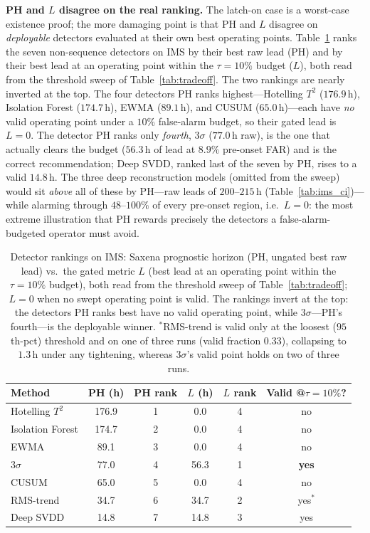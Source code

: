 \documentclass[journal]{IEEEtran}
\begin{document}
\textbf{PH and $L$ disagree on the real ranking.} The latch-on case is a worst-case
existence proof; the more damaging point is that PH and $L$ disagree on
\emph{deployable} detectors evaluated at their own best operating points.
Table~\ref{tab:phrank} ranks the seven non-sequence detectors on IMS by their best
raw lead (PH) and by their best lead at an operating point within the $\tau{=}10\%$
budget ($L$), both read from the threshold sweep of Table~\ref{tab:tradeoff}. The two
rankings are nearly inverted at the top. The four detectors PH ranks
highest---Hotelling $T^2$ ($176.9$\,h), Isolation Forest ($174.7$\,h), EWMA
($89.1$\,h), and CUSUM ($65.0$\,h)---each have \emph{no} valid operating point under a
$10\%$ false-alarm budget, so their gated lead is $L{=}0$. The detector PH ranks only
\emph{fourth}, 3$\sigma$ ($77.0$\,h raw), is the one that actually clears the budget
($56.3$\,h of lead at $8.9\%$ pre-onset FAR) and is the correct recommendation; Deep
SVDD, ranked last of the seven by PH, rises to a valid $14.8$\,h. The three deep
reconstruction models (omitted from the sweep) would sit \emph{above} all of these by
PH---raw leads of $200$--$215$\,h (Table~\ref{tab:ims_ci})---while alarming through
$48$--$100\%$ of every pre-onset region, i.e.\ $L{=}0$: the most extreme illustration
that PH rewards precisely the detectors a false-alarm-budgeted operator must avoid.

\begin{table}[t]
\caption{Detector rankings on IMS: Saxena prognostic horizon (PH, ungated best raw
lead) vs.\ the gated metric $L$ (best lead at an operating point within the
$\tau{=}10\%$ budget), both read from the threshold sweep of
Table~\ref{tab:tradeoff}; $L{=}0$ when no swept operating point is valid. The
rankings invert at the top: the detectors PH ranks best have no valid operating
point, while 3$\sigma$---PH's fourth---is the deployable winner. $^{\ast}$RMS-trend
is valid only at the loosest ($95$th-pct) threshold and on one of three runs (valid
fraction $0.33$), collapsing to $1.3$\,h under any tightening, whereas 3$\sigma$'s
valid point holds on two of three runs.}
\label{tab:phrank}
\centering
\footnotesize
\setlength{\tabcolsep}{4pt}
\begin{tabular}{@{}lccccc@{}}
\toprule
Method & PH (h) & PH rank & $L$ (h) & $L$ rank & Valid @$\tau{=}10\%$? \\
\midrule
Hotelling $T^2$  & 176.9 & 1 & \phantom{0}0.0 & 4 & no \\
Isolation Forest & 174.7 & 2 & \phantom{0}0.0 & 4 & no \\
EWMA             & \phantom{0}89.1 & 3 & \phantom{0}0.0 & 4 & no \\
3$\sigma$        & \phantom{0}77.0 & 4 & 56.3 & 1 & \textbf{yes} \\
CUSUM            & \phantom{0}65.0 & 5 & \phantom{0}0.0 & 4 & no \\
RMS-trend        & \phantom{0}34.7 & 6 & 34.7 & 2 & yes$^{\ast}$ \\
Deep SVDD        & \phantom{0}14.8 & 7 & 14.8 & 3 & yes \\
\bottomrule
\end{tabular}
\end{table}
\end{document}
